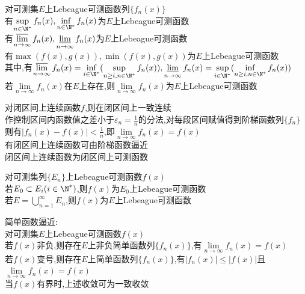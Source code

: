 \begin{dingli}
对可测集$E$上Lebeague可测函数列$\{f_n(x)\}$\\
有$\sup\limits_{n\in\N^*}f_n(x),\inf\limits_{n\in\N^*}f_n(x)$为$E$上Lebeague可测函数\\
有$\varlimsup\limits_{n\to\infty}f_n(x),\varliminf\limits_{n\to\infty}f_n(x)$为$E$上Lebeague可测函数\\
有$\max(f(x),g(x)),\min(f(x),g(x))$为$E$上Lebeague可测函数\\
其中,有$\varlimsup\limits_{n\to\infty}f_n(x)=\inf\limits_{i\in\N^*}(\sup\limits_{n\geq i,n\in\N^*}f_n(x)),\varliminf\limits_{n\to\infty}f_n(x)=\sup\limits_{i\in\N^*}(\inf\limits_{n\geq i,n\in\N^*}f_n(x))$\\
若$\lim\limits_{n\to\infty}f_n(x)$在$E$上存在,则$\lim\limits_{n\to\infty}f_n(x)$为$E$上Lebeague可测函数
\end{dingli}

\begin{tuilun}
对闭区间上连续函数$f$,则在闭区间上一致连续\\
作控制区间内函数值之差小于$\varepsilon_{n}=\frac{1}{n}$的分法,对每段区间赋值得到阶梯函数列$\{f_n\}$\\
则有$|f_n(x)-f(x)|<\frac{1}{n}$,即$\lim\limits_{n\to\infty}f_n(x)=f(x)$\\
有闭区间上连续函数可由阶梯函数逼近\\
闭区间上连续函数为闭区间上可测函数
\end{tuilun}

\begin{dingli}
对可测集列$\{E_n\}$上Lebeague可测函数$f(x)$\\
若$E_0\subset E_i(i\in\N^*)$,则$f(x)$为$E_0$上Lebeague可测函数\\
若$E=\bigcup\limits_{n=1}^{\infty}E_n$,则$f(x)$为$E$上Lebeague可测函数
\end{dingli}

\begin{dingli}
简单函数逼近:\\
对可测集$E$上Lebeague可测函数$f(x)$\\
若$f(x)$非负,则存在$E$上非负简单函数列$\{f_n(x)\}$,有$\lim\limits_{n\to\infty}f_n(x)=f(x)$\\
若$f(x)$变号,则存在$E$上简单函数列$\{f_n(x)\}$,有$|f_n(x)|\leq |f(x)|$且$\lim\limits_{n\to\infty}f_n(x)=f(x)$\\
当$f(x)$有界时,上述收敛可为一致收敛
\end{dingli}

